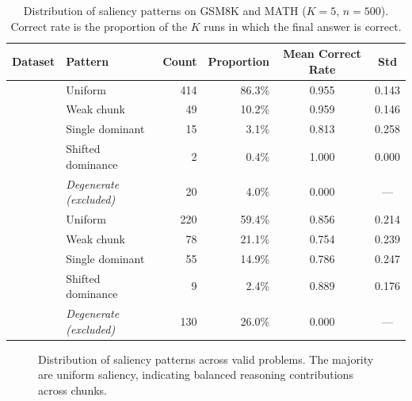 \documentclass[12pt]{report}
\begin{document}
\begin{table}[t]
\centering
\caption{Distribution of saliency patterns on GSM8K and MATH
($K\!=\!5$, $n\!=\!500$). Correct rate is the proportion of the $K$ runs in which the final answer is correct.}
\label{tab:saliency-patterns-gsm8k-math}
\begin{tabular}{llrrcc}
\toprule
\textbf{Dataset} & \textbf{Pattern} & \textbf{Count} & \textbf{Proportion}
    & \textbf{Mean Correct Rate} & \textbf{Std} \\
\midrule
{}
& Uniform           & 414 & 86.3\% & 0.955 & 0.143 \\
& Weak chunk        &  49 & 10.2\% & 0.959 & 0.146 \\
& Single dominant   &  15 &  3.1\% & 0.813 & 0.258 \\
& Shifted dominance &   2 &  0.4\% & 1.000 & 0.000 \\
& \emph{Degenerate (excluded)} & 20 & 4.0\% & 0.000 & --- \\
\midrule
{}
& Uniform           & 220 & 59.4\% & 0.856 & 0.214 \\
& Weak chunk        &  78 & 21.1\% & 0.754 & 0.239 \\
& Single dominant   &  55 & 14.9\% & 0.786 & 0.247 \\
& Shifted dominance &   9 &  2.4\% & 0.889 & 0.176 \\
& \emph{Degenerate (excluded)} & 130 & 26.0\% & 0.000 & --- \\
\bottomrule
\end{tabular}
\end{table}


\begin{figure}[t]
\centering
{}
\caption{Distribution of saliency patterns across valid problems.  The majority are uniform saliency,
indicating balanced reasoning contributions across chunks.}
\label{fig:saliency-pattern-dist}
\end{figure}
\end{document}
